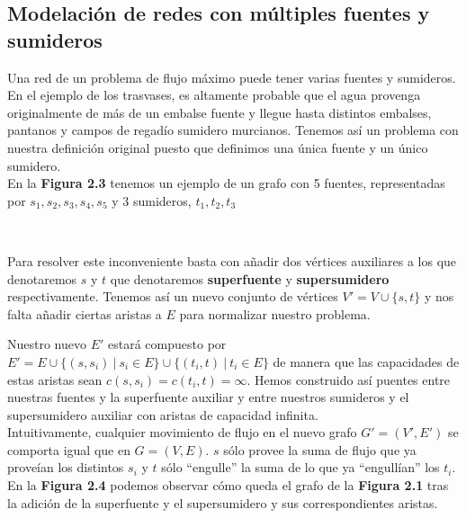 \subsection{Modelación de redes con múltiples fuentes y sumideros}

Una red de un problema de flujo máximo puede tener varias fuentes y sumideros. En el ejemplo de los trasvases, es altamente probable que el agua provenga originalmente de más de un embalse fuente y llegue hasta distintos embalses, pantanos y campos de regadío sumidero murcianos. Tenemos así un problema con nuestra definición original puesto que definimos una única fuente y un único sumidero.\\

En la \textbf{Figura 2.3} tenemos un ejemplo de un grafo con 5 fuentes, representadas por $s_1,s_2,s_3,s_4,s_5$ y 3 sumideros, $t_1,t_2,t_3$
\begin{figura}\ \begin{center}\end{center}\end{figura}

Para resolver este inconveniente basta con añadir dos vértices auxiliares a los que denotaremos $s$ y $t$ que denotaremos \textbf{superfuente} y \textbf{supersumidero} respectivamente. Tenemos así un nuevo conjunto de vértices $V'=V\cup \{s,t\}$ y nos falta añadir ciertas aristas a $E$ para normalizar nuestro problema.

Nuestro nuevo $E'$ estará compuesto por $E'=E\cup\{(s,s_i)\ |\ s_i\in E\}\cup\{(t_i,t)\ |\ t_i\in E\}$ de manera que las capacidades de estas aristas sean $c(s,s_i)=c(t_i,t)=\infty$. Hemos construido así puentes entre nuestras fuentes y la superfuente auxiliar y entre nuestros sumideros y el supersumidero auxiliar con aristas de capacidad infinita.\\

Intuitivamente, cualquier movimiento de flujo en el nuevo grafo $G'=(V',E')$ se comporta igual que en $G=(V,E)$. $s$ sólo provee la suma de flujo que ya proveían los distintos $s_i$ y $t$ sólo ``engulle'' la suma de lo que ya ``engullían'' los $t_i$.\\

En la \textbf{Figura 2.4} podemos observar cómo queda el grafo de la \textbf{Figura 2.1} tras la adición de la superfuente y el supersumidero y sus correspondientes aristas.
\begin{figura}\ \begin{center}\end{center}\end{figura}